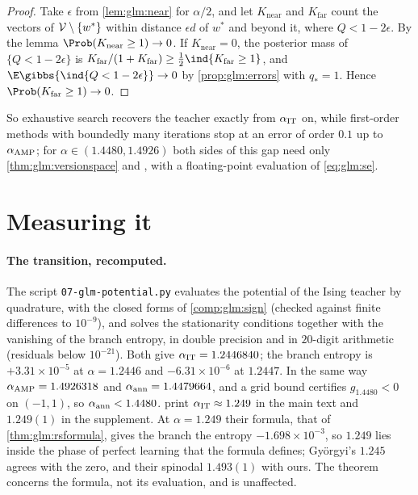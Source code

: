 \begin{refsection}
\begin{proof}
Take $\epsilon$ from \cref{lem:glm:near} for $\alpha/2$, and let $K_{\mathrm{near}}$ and $K_{\mathrm{far}}$ count the vectors of $\mathcal{V}\setminus\{w^*\}$ within distance $\epsilon d$ of $w^*$ and beyond it, where $Q<1-2\epsilon$. By the lemma $\Prob(K_{\mathrm{near}}\ge1)\to0$. If $K_{\mathrm{near}}=0$, the posterior mass of $\{Q<1-2\epsilon\}$ is $K_{\mathrm{far}}/(1+K_{\mathrm{far}})\ge\frac12\ind\{K_{\mathrm{far}}\ge1\}$, and $\E\gibbs{\ind\{Q<1-2\epsilon\}}\to0$ by \cref{prop:glm:errors} with $q_*=1$. Hence $\Prob(K_{\mathrm{far}}\ge1)\to0$.
\end{proof}

So exhaustive search recovers the teacher exactly from $\alpha_{\mathrm{IT}}$ on, while first-order methods with boundedly many iterations stop at an error of order $0.1$ up to $\alpha_{\mathrm{AMP}}$; for $\alpha\in(1.4480,1.4926)$ both sides of this gap need only \cref{thm:glm:versionspace} and \textcite{CelentanoMontanariWu2020}, with a floating-point evaluation of \eqref{eq:glm:se}.

\section{Measuring it}\label{sec:glm:measuring}

\paragraph{The transition, recomputed.} The script \texttt{07-glm-potential.py} evaluates the potential of the Ising teacher by quadrature, with the closed forms of \cref{comp:glm:sign} (checked against finite differences to $10^{-9}$), and solves the stationarity conditions together with the vanishing of the branch entropy, in double precision and in $20$-digit arithmetic (residuals below $10^{-21}$). Both give $\alpha_{\mathrm{IT}}=1.2446840$; the branch entropy is $+3.31\times10^{-5}$ at $\alpha=1.2446$ and $-6.31\times10^{-6}$ at $1.2447$. In the same way $\alpha_{\mathrm{AMP}}=1.4926318$ and $\alpha_{\mathrm{ann}}=1.4479664$, and a grid bound certifies $g_{1.4480}<0$ on $(-1,1)$, so $\alpha_{\mathrm{ann}}<1.4480$. \Textcite{BarbierEtAl2019} print $\alpha_{\mathrm{IT}}\approx1.249$ in the main text and $1.249(1)$ in the supplement. At $\alpha=1.249$ their formula, that of \cref{thm:glm:rsformula}, gives the branch the entropy $-1.698\times10^{-3}$, so $1.249$ lies inside the phase of perfect learning that the formula defines; Gy\"orgyi's $1.245$ agrees with the zero, and their spinodal $1.493(1)$ with ours. The theorem concerns the formula, not its evaluation, and is unaffected.


\end{refsection}
